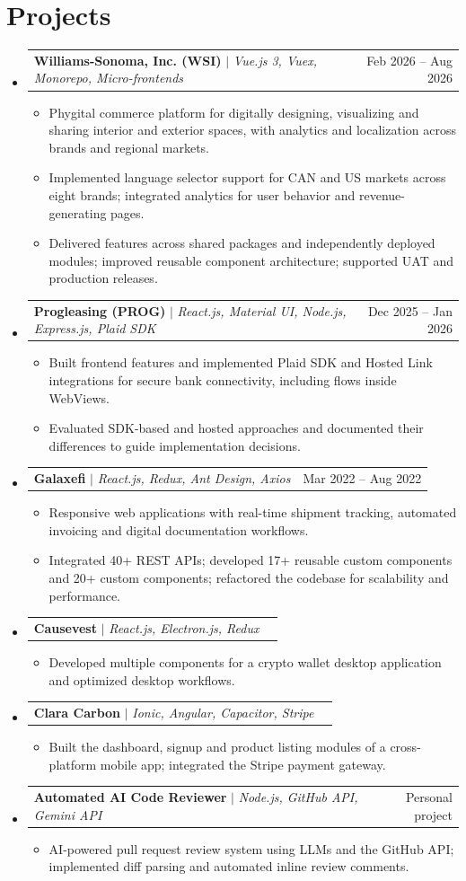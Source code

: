 \documentclass[letterpaper,10.5pt]{article}
\makeatletter
\newcommand{\resumeItem}[1]{\item\small{#1\vspace{-2pt}}}
\newcommand{\resumeProjectHeading}[2]{\item\begin{tabular*}{0.97\textwidth}{l@{\extracolsep{\fill}}r}\small#1&#2\\\end{tabular*}\vspace{-7pt}}
\newcommand{\resumeSubHeadingListStart}{\begin{itemize}[leftmargin=0.15in,label={}]}
\newcommand{\resumeSubHeadingListEnd}{\end{itemize}}
\newcommand{\resumeItemListStart}{\begin{itemize}[leftmargin=0.18in]}
\newcommand{\resumeItemListEnd}{\end{itemize}\vspace{-5pt}}
\makeatother
\begin{document}
\section{Projects}
\resumeSubHeadingListStart
\resumeProjectHeading{\textbf{Williams-Sonoma, Inc. (WSI)} $|$ \emph{Vue.js 3, Vuex, Monorepo, Micro-frontends}}{Feb 2026 -- Aug 2026}
\resumeItemListStart
\resumeItem{Phygital commerce platform for digitally designing, visualizing and sharing interior and exterior spaces, with analytics and localization across brands and regional markets.}
\resumeItem{Implemented language selector support for CAN and US markets across eight brands; integrated analytics for user behavior and revenue-generating pages.}
\resumeItem{Delivered features across shared packages and independently deployed modules; improved reusable component architecture; supported UAT and production releases.}
\resumeItemListEnd
\resumeProjectHeading{\textbf{Progleasing (PROG)} $|$ \emph{React.js, Material UI, Node.js, Express.js, Plaid SDK}}{Dec 2025 -- Jan 2026}
\resumeItemListStart
\resumeItem{Built frontend features and implemented Plaid SDK and Hosted Link integrations for secure bank connectivity, including flows inside WebViews.}
\resumeItem{Evaluated SDK-based and hosted approaches and documented their differences to guide implementation decisions.}
\resumeItemListEnd
\resumeProjectHeading{\textbf{Galaxefi} $|$ \emph{React.js, Redux, Ant Design, Axios}}{Mar 2022 -- Aug 2022}
\resumeItemListStart
\resumeItem{Responsive web applications with real-time shipment tracking, automated invoicing and digital documentation workflows.}
\resumeItem{Integrated 40+ REST APIs; developed 17+ reusable custom components and 20+ custom components; refactored the codebase for scalability and performance.}
\resumeItemListEnd
\resumeProjectHeading{\textbf{Causevest} $|$ \emph{React.js, Electron.js, Redux}}{}
\resumeItemListStart
\resumeItem{Developed multiple components for a crypto wallet desktop application and optimized desktop workflows.}
\resumeItemListEnd
\resumeProjectHeading{\textbf{Clara Carbon} $|$ \emph{Ionic, Angular, Capacitor, Stripe}}{}
\resumeItemListStart
\resumeItem{Built the dashboard, signup and product listing modules of a cross-platform mobile app; integrated the Stripe payment gateway.}
\resumeItemListEnd
\resumeProjectHeading{\textbf{Automated AI Code Reviewer} $|$ \emph{Node.js, GitHub API, Gemini API}}{Personal project}
\resumeItemListStart
\resumeItem{AI-powered pull request review system using LLMs and the GitHub API; implemented diff parsing and automated inline review comments.}
\resumeItemListEnd
\resumeSubHeadingListEnd
\end{document}
